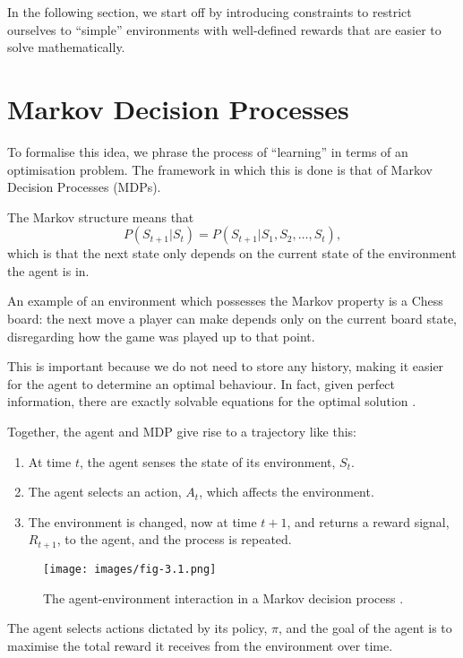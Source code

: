 \documentclass{article}
\begin{document}
In the following section, we start off by introducing constraints to restrict ourselves to ``simple'' environments with well-defined rewards that are easier to solve mathematically. 

\section{Markov Decision Processes}

To formalise this idea, we phrase the process of ``learning'' in terms of an optimisation problem. The framework in which this is done is that of Markov Decision Processes (MDPs).

The Markov structure means that $$P(S_{t+1} | S_t) = P(S_{t+1} | S_1, S_2, \dots, S_t),$$ which is that the next state only depends on the current state of the environment the agent is in. 

An example of an environment which possesses the Markov property is a Chess board: the next move a player can make depends only on the current board state, disregarding how the game was played up to that point. 

This is important because we do not need to store any history, making it easier for the agent to determine an optimal behaviour. In fact, given perfect information, there are exactly solvable equations for the optimal solution \cite{}.

Together, the agent and MDP give rise to a trajectory like this:

\begin{enumerate}
  \item{At time $t$, the agent senses the state of its environment, $S_t$.}
  \item{The agent selects an action, $A_t$, which affects the environment.}
  \item{The environment is changed, now at time $t+1$, and returns a reward signal, $R_{t+1}$, to the agent, and the process is repeated.}
\end{enumerate}

\begin{figure}[h]
  \centering
  \texttt{[image: images/fig-3.1.png]}
  \caption{The agent-environment interaction in a Markov decision process \cite{Sutton1998}.}
\end{figure}

The agent selects actions dictated by its policy, $\pi$, and the goal of the agent is to maximise the total reward it receives from the environment over time.
\end{document}
